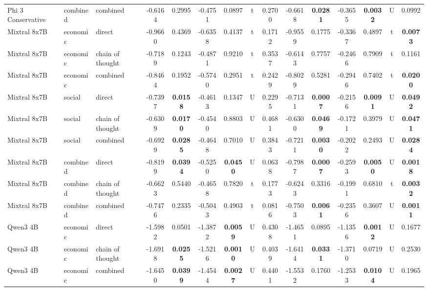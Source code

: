 \begin{center}
\begin{longtable}{@{}lll|cccccc|cccccc@{}}
        \rowcolor{gray!20} Phi 3 Conservative & combined & combined & -0.6164 & 0.2995 & -0.4751 & 0.0897 & t & 0.2700 & -0.6618 & \textbf{0.0281} & -0.3655 & \textbf{0.0032} & U & 0.0992 \\
        Mixtral 8x7B & economic & direct & -0.9660 & 0.4369 & -0.6358 & 0.4137 & t & 0.1712 & -0.9559 & 0.1775 & -0.3367 & 0.4897 & t & \textbf{0.0073} \\
        Mixtral 8x7B & economic & chain of thought & -0.7189 & 0.1243 & -0.4871 & 0.9210 & t & 0.3537 & -0.6143 & 0.7757 & -0.2466 & 0.7909 & t & 0.1161 \\
        Mixtral 8x7B & economic & combined & -0.8464 & 0.1952 & -0.5740 & 0.2951 & t & 0.2429 & -0.8029 & 0.5281 & -0.2946 & 0.7402 & t & \textbf{0.0200} \\
        Mixtral 8x7B & social & direct & -0.7397 & \textbf{0.0158} & -0.4613 & 0.1347 & U & 0.2295 & -0.7131 & \textbf{0.0007} & -0.2156 & \textbf{0.0091} & U & \textbf{0.0492} \\
        Mixtral 8x7B & social & chain of thought & -0.6309 & \textbf{0.0170} & -0.4540 & 0.8803 & U & 0.4681 & -0.6300 & \textbf{0.0469} & -0.1721 & 0.3979 & U & \textbf{0.0471} \\
        Mixtral 8x7B & social & combined & -0.6929 & \textbf{0.0285} & -0.4648 & 0.7010 & U & 0.3843 & -0.7211 & \textbf{0.0030} & -0.2022 & 0.2493 & U & \textbf{0.0284} \\
        Mixtral 8x7B & combined & direct & -0.8199 & \textbf{0.0394} & -0.5250 & \textbf{0.0450} & U & 0.0638 & -0.7987 & \textbf{0.0007} & -0.2593 & \textbf{0.0050} & U & \textbf{0.0018} \\
        Mixtral 8x7B & combined & chain of thought & -0.6623 & 0.5440 & -0.4658 & 0.7820 & t & 0.1773 & -0.6243 & 0.3316 & -0.1991 & 0.6810 & t & \textbf{0.0032} \\
        \rowcolor{gray!20} Mixtral 8x7B & combined & combined & -0.7476 & 0.2335 & -0.5043 & 0.4903 & t & 0.0816 & -0.7503 & \textbf{0.0061} & -0.2356 & 0.3607 & U & \textbf{0.0011} \\
        Qwen3 4B & economic & direct & -1.5982 & 0.0501 & -1.3872 & \textbf{0.0059} & U & 0.4308 & -1.4651 & 0.0895 & -1.1356 & \textbf{0.0012} & U & 0.1677 \\
        Qwen3 4B & economic & chain of thought & -1.6918 & \textbf{0.0255} & -1.5216 & \textbf{0.0010} & U & 0.4039 & -1.6414 & \textbf{0.0331} & -1.3710 & 0.0719 & U & 0.2530 \\
        Qwen3 4B & economic & combined & -1.6450 & \textbf{0.0399} & -1.4544 & \textbf{0.0027} & U & 0.4401 & -1.5532 & 0.1760 & -1.2533 & \textbf{0.0104} & U & 0.1965 \\

\end{longtable}
\end{center}
